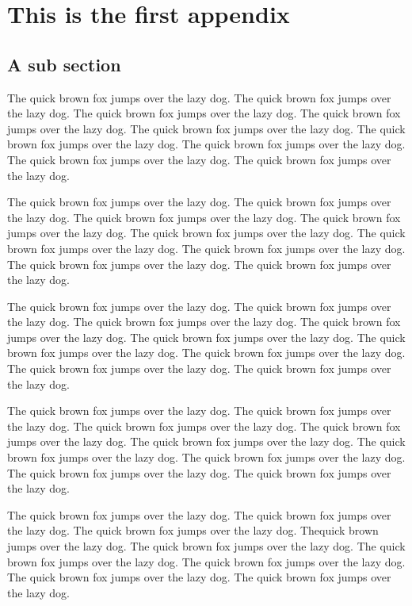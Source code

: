 \documentclass[openany,twoside,12pt]{book}
\theoremstyle{plain}
\numberwithin{equation}{chapter}
\numberwithin{figure}{chapter}
\numberwithin{table}{chapter}
\begin{document}
\appendix

\chapter{This is the first appendix}
\section{A sub section}

The quick brown fox jumps over the lazy dog. The quick brown fox jumps over the lazy dog. The quick brown fox jumps over the lazy dog. The quick brown fox jumps over the lazy dog. The quick brown fox jumps over the lazy dog. The quick brown fox jumps over the lazy dog. The quick brown fox jumps over the lazy dog. The quick brown fox jumps over the lazy dog. The quick brown fox jumps over the lazy dog.

The quick brown fox jumps over the lazy dog. The quick brown fox jumps over the lazy dog. The quick brown fox jumps over the lazy dog. The quick brown fox jumps over the lazy dog. The quick brown fox jumps over the lazy dog. The quick brown fox jumps over the lazy dog. The quick brown fox jumps over the lazy dog. The quick brown fox jumps over the lazy dog. The quick brown fox jumps over the lazy dog.


The quick brown fox jumps over the lazy dog. The quick brown fox jumps over the lazy dog. The quick brown fox jumps over the lazy dog. The quick brown fox jumps over the lazy dog. The quick brown fox jumps over the lazy dog. The quick brown fox jumps over the lazy dog. The quick brown fox jumps over the lazy dog. The quick brown fox jumps over the lazy dog. The quick brown fox jumps over the lazy dog.


The quick brown fox jumps over the lazy dog. The quick brown fox jumps over the lazy dog. The quick brown fox jumps over the lazy dog. The quick brown fox jumps over the lazy dog. The quick brown fox jumps over the lazy dog. The quick brown fox jumps over the lazy dog. The quick brown fox jumps over the lazy dog. The quick brown fox jumps over the lazy dog. The quick brown fox jumps over the lazy dog.


The quick brown fox jumps over the lazy dog. The quick brown fox jumps over the lazy dog. The quick brown fox jumps over the lazy dog. Thequick brown  jumps over the lazy dog. The quick brown fox jumps over the lazy dog. The quick brown fox jumps over the lazy dog. The quick brown fox jumps over the lazy dog. The quick brown fox jumps over the lazy dog. The quick brown fox jumps over the lazy dog.
\end{document}

